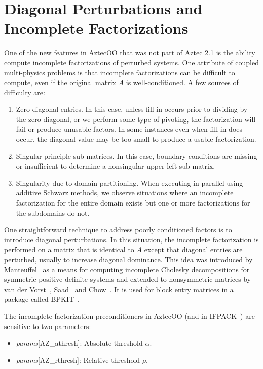 \documentclass[12pt,relax]{AztecOOUserGuide}
\begin{document}
\section{Diagonal Perturbations and Incomplete Factorizations}
\label{Sect:DiagonalPerturbations}
 One of the new features in AztecOO
that was not part of Aztec 2.1 is the ability compute incomplete
factorizations of perturbed systems. One attribute of coupled
multi-physics problems is that incomplete factorizations can be
difficult to compute, even if the original matrix $A$ is
well-conditioned.  A few sources of difficulty are:
\begin{enumerate}
\item Zero diagonal entries.  In this case, unless fill-in occurs prior
to dividing by the zero diagonal, or we perform some type of pivoting, the
factorization will fail or produce unusable factors.  In some
instances even when fill-in does occur, the diagonal value may be
too small to produce a usable factorization.
\item Singular principle sub-matrices.  In this case, boundary
conditions are missing or insufficient to determine a nonsingular
upper left sub-matrix.
\item Singularity due to domain partitioning.  When executing in
parallel using additive Schwarz methods, we observe situations where
an incomplete factorization for the entire domain exists but one or
more factorizations for the subdomains do not.
\end{enumerate}

One straightforward technique to address poorly conditioned factors
is to introduce diagonal perturbations.  In this
situation, the incomplete factorization is performed on a matrix that
is identical to $A$ except that diagonal entries
are perturbed, usually to increase diagonal dominance.
This idea was introduced by
Manteuffel~\cite{Manteuffel:80} as a means for computing incomplete
Cholesky decompositions for symmetric positive definite systems
and extended to nonsymmetric matrices by van der
Vorst~\cite{vanderVorst:81},
Saad~\cite{Saad:94a} and Chow~\cite{Chow:97}.  It is used for
block entry matrices in a package called BPKIT~\cite{ChowHeroux:98}.

The incomplete factorization preconditioners in AztecOO (and in
IFPACK~\cite{Ifpack-home-page}) are sensitive to two parameters:
\begin{itemize}
  \item {\it params}[{\sf AZ\_athresh}]: Absolute threshold $\alpha$.
  \item {\it params}[{\sf AZ\_rthresh}]: Relative threshold $\rho$.
\end{itemize}
\end{document}
